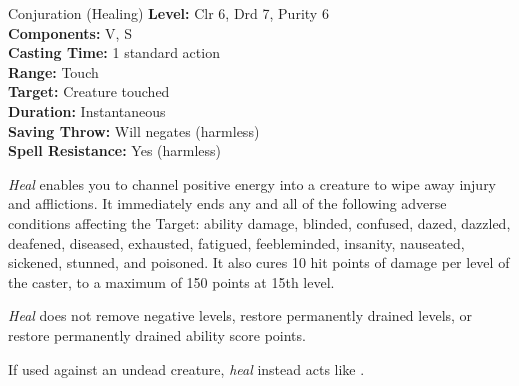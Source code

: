 {Conjuration (Healing)}
{
	\textbf{Level:}
	Clr 6, Drd 7, Purity 6\\
	\textbf{Components:}
	V, S\\
	\textbf{Casting Time:}
	1 standard action\\
	\textbf{Range:}
	Touch\\
	\textbf{Target:}
	Creature touched\\
	\textbf{Duration:}
	Instantaneous\\
	\textbf{Saving Throw:}
	Will negates (harmless)\\
	\textbf{Spell Resistance:}
	Yes (harmless)\\
}
{
	\emph{Heal} enables you to channel positive energy into a creature to wipe away injury and afflictions. It immediately ends any and all of the following adverse conditions affecting the Target: ability damage, blinded, confused, dazed, dazzled, deafened, diseased, exhausted, fatigued, feebleminded, insanity, nauseated, sickened, stunned, and poisoned. It also cures 10 hit points of damage per level of the caster, to a maximum of 150 points at 15th level.

	\emph{Heal} does not remove negative levels, restore permanently drained levels, or restore permanently drained ability score points.

	If used against an undead creature, \emph{heal} instead acts like .

}
